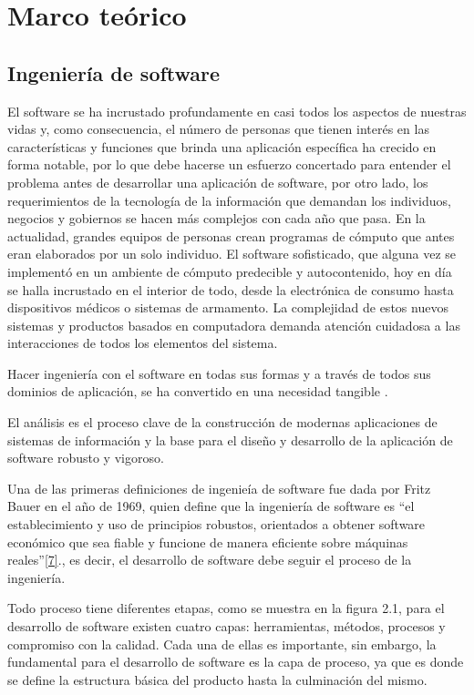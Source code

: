 \chapter{Marco teórico}

\section{Ingeniería de software}

El software se ha incrustado profundamente en casi todos los aspectos de nuestras vidas y, como consecuencia, el número de personas que tienen interés en las características y funciones que brinda una aplicación específica ha crecido en forma notable, por lo que debe hacerse un esfuerzo concertado para entender el problema antes de desarrollar una aplicación de software, por otro lado, los requerimientos de la tecnología de la información que demandan los individuos, negocios y gobiernos se hacen más complejos con cada año que pasa. En la actualidad, grandes equipos de personas crean programas de cómputo que antes eran elaborados por un solo individuo. El software sofisticado, que alguna vez se implementó en un ambiente de cómputo predecible y autocontenido, hoy en día se halla incrustado en el interior de todo, desde la electrónica de consumo hasta dispositivos médicos o sistemas de armamento. La complejidad de estos nuevos sistemas y productos basados en computadora demanda atención cuidadosa a las interacciones de todos los elementos del sistema.

Hacer ingeniería con el software en todas sus formas y a través de todos sus dominios de aplicación, se ha convertido en una necesidad tangible . 

El análisis es el proceso clave de la construcción de modernas aplicaciones de sistemas de información y la base para el diseño y desarrollo de la aplicación de software robusto y vigoroso. 


Una de las primeras definiciones de ingenieía de software fue dada por Fritz Bauer en el año de
1969, quien define que la ingeniería de software es “el establecimiento y uso de principios robustos, orientados a obtener software económico que sea fiable y funcione de manera eficiente sobre máquinas
reales”\hyperlink{b07}{[7]}., es decir, el desarrollo de software debe seguir el proceso de la ingeniería.

Todo proceso tiene diferentes etapas, como se muestra en la figura 2.1, para el desarrollo de software existen cuatro capas: herramientas, métodos, procesos y compromiso con la calidad. Cada una de ellas es importante, sin embargo, la fundamental para el desarrollo de software es la capa de proceso, ya que es donde se define la estructura básica del producto hasta la culminación del mismo.

